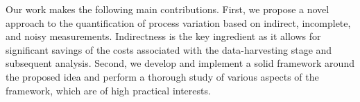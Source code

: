 Our work makes the following main contributions.
First, we propose a novel approach to the quantification of process variation based on indirect, incomplete, and noisy measurements.
Indirectness is the key ingredient as it allows for significant savings of the costs associated with the data-harvesting stage and subsequent analysis.
Second, we develop and implement a solid framework around the proposed idea and perform a thorough study of various aspects of the framework, which are of high practical interests.
